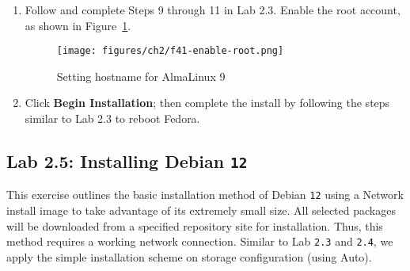 \begin{enumerate}

\item Follow and complete Steps 9 through 11 in Lab 2.3. Enable the root account, as shown in Figure~\ref{fig:f41-root-pkg}. 

\begin{figure}[hbt!]\centering
   \texttt{[image: figures/ch2/f41-enable-root.png]}
   \caption{Setting hostname for AlmaLinux 9} \label{fig:f41-root-pkg} %
\end{figure}

\item Click {\bf{Begin Installation}}; then complete the install by following the steps similar to Lab 2.3 to reboot Fedora.  

\end{enumerate}

%
\subsection*{Lab 2.5: Installing Debian {\tt{12}}}

This exercise outlines the basic installation method of Debian {\tt{12}} using a Network install image to take advantage of its extremely small size. All selected packages will be downloaded from a specified repository site for installation. Thus, this method requires a working network connection. Similar to Lab {\tt{2.3}} and {\tt{2.4}}, we apply the simple installation scheme on storage configuration (using Auto). 

